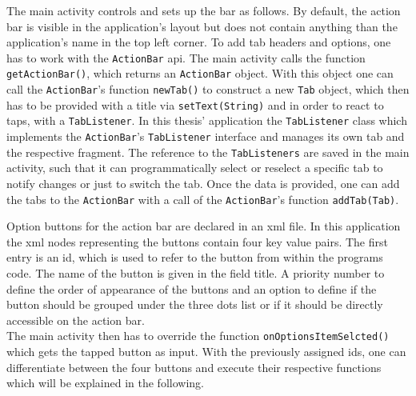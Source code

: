 The  main activity controls and sets up the bar as follows. By default, the action bar is visible in the application's layout but does not contain anything than the application's name in the top left corner. To add tab headers and options, one has to work with the \lstinline{ActionBar} api. The main activity calls the function \lstinline$getActionBar()$, which returns an \lstinline{ActionBar} object. With this object one can call the \lstinline{ActionBar}'s function \lstinline$newTab()$ to construct a new \lstinline{Tab} object, which then has to be provided with a title via \lstinline$setText(String)$ and in order to react to taps, with a \lstinline{TabListener}. In this thesis' application the \lstinline{TabListener} class which implements the \lstinline{ActionBar}'s \lstinline{TabListener} interface and manages its own tab and the respective fragment. The reference to the \lstinline{TabListeners} are saved in the main activity, such that it can programmatically select or reselect a specific tab to notify changes or just to switch the tab. Once the data is provided, one can add the tabs to the \lstinline{ActionBar} with a call of the \lstinline{ActionBar}'s function \lstinline$addTab(Tab)$.

Option buttons  for the action bar are declared in an xml file. In this application the xml nodes representing the buttons contain four key value pairs.
The first entry is an id, which is used to refer to the button from within the programs code. The name of the button is given in the field title. A priority number to define the order of appearance of the buttons and an option to define if the button should be grouped under the three dots list or if it should be directly accessible on the action bar.\\
The main activity then has to override the function \lstinline$onOptionsItemSelcted()$ which gets the tapped button as input. With the previously assigned ids, one can differentiate between the four buttons and execute their respective functions which will be explained in the following.

